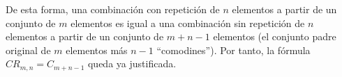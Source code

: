 De esta forma, una combinación con repetición de $n$ elementos a partir de un conjunto de $m$ elementos es igual a una combinación sin repetición de $n$ elementos a partir de un conjunto de $m+n-1$ elementos (el conjunto padre original de $m$ elementos más $n-1$ ``comodines''). Por tanto, la fórmula $CR_{m,n} = C_{m+n-1}$ queda ya justificada.
